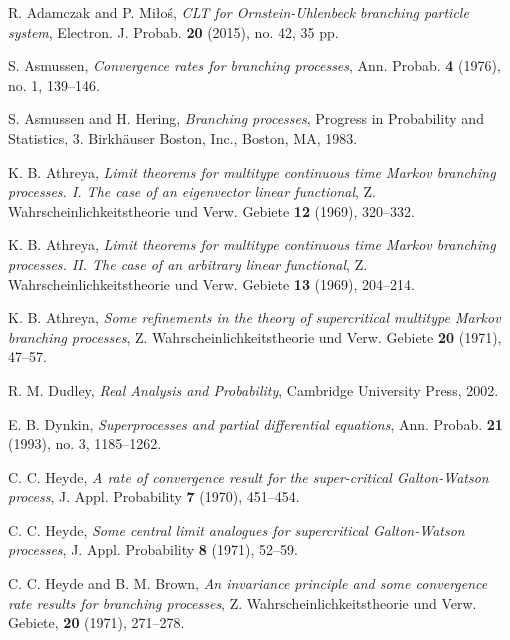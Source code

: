 \documentclass[12pt,a4paper]{amsart}
\theoremstyle{plain}
\theoremstyle{definition}
\numberwithin{equation}{section}
\begin{document}
\begin{thebibliography}{10}

  R. Adamczak and P. Mi{\l}o\'{s}, \emph{C{LT} for {O}rnstein-{U}hlenbeck branching particle system},
  Electron. J. Probab. \textbf{20} (2015), no. 42, 35 pp.

  S. Asmussen, \emph{Convergence rates for branching processes},
  Ann. Probab.  \textbf{4} (1976), no. 1, 139--146.

  S. Asmussen and H. Hering, \emph{Branching processes},
  Progress in Probability and Statistics, 3. Birkh\"{a}user Boston, Inc., Boston, MA, 1983.

  K. B. Athreya,
  \emph{Limit theorems for multitype continuous time {M}arkov branching processes. {I}. {T}he case of an eigenvector linear functional},
  Z. Wahrscheinlichkeitstheorie und Verw. Gebiete \textbf{12} (1969), 320--332.

  K. B. Athreya,
  \emph{Limit theorems for multitype continuous time {M}arkov branching processes. {II}. {T}he case of an arbitrary linear functional},
  Z. Wahrscheinlichkeitstheorie und Verw. Gebiete \textbf{13} (1969), 204--214.

  K. B. Athreya,
  \emph{Some refinements in the theory of supercritical multitype {M}arkov branching processes},
  Z. Wahrscheinlichkeitstheorie und Verw. Gebiete \textbf{20} (1971), 47--57.

  R. M. Dudley,
\emph{Real Analysis and Probability},
  Cambridge University Press, 2002.

  E. B. Dynkin,
  \emph{Superprocesses and partial differential equations},
  Ann. Probab. \textbf{21} (1993), no. 3, 1185--1262.

C. C. Heyde,
 \emph{A rate of convergence result for the super-critical {G}alton-{W}atson process},
  J. Appl. Probability \textbf{7} (1970), 451--454.

  C. C. Heyde,
   \emph{Some central limit analogues for supercritical {G}alton-{W}atson processes},
  J. Appl. Probability \textbf{8} (1971), 52--59.

  C. C. Heyde and B. M. Brown,
  \emph{An invariance principle and some convergence rate results for branching processes},
 Z. Wahrscheinlichkeitstheorie und Verw. Gebiete, \textbf{20} (1971), 271--278.


\end{thebibliography}
\end{document}
